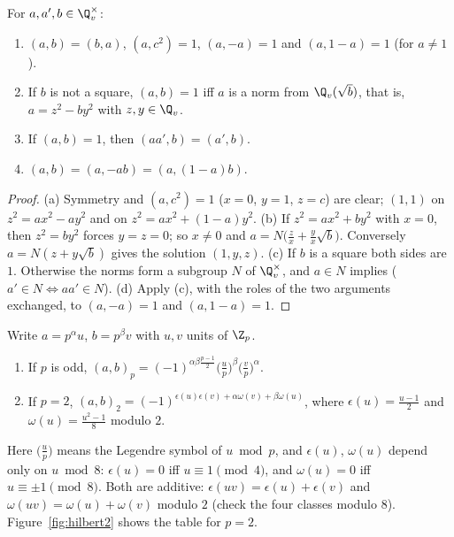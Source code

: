 \begin{proposition}\label{prop:hilbertbasic}
For $a,a',b\in\Q_v^\times$:
\begin{enumerate}[label=(\alph*)]
\item $(a,b)=(b,a)$, $(a,c^2)=1$, $(a,-a)=1$ and $(a,1-a)=1$ (for $a\ne1$).
\item If $b$ is not a square, $(a,b)=1$ iff $a$ is a norm from $\Q_v(\sqrt b)$, that is, $a=z^2-by^2$ with $z,y\in\Q_v$.
\item If $(a,b)=1$, then $(aa',b)=(a',b)$.
\item $(a,b)=(a,-ab)=(a,(1-a)b)$.
\end{enumerate}
\end{proposition}
\begin{proof}
(a) Symmetry and $(a,c^2)=1$ ($x=0$, $y=1$, $z=c$) are clear; $(1,1)$ on $z^2=ax^2-ay^2$ and on $z^2=ax^2+(1-a)y^2$.
(b) If $z^2=ax^2+by^2$ with $x=0$, then $z^2=by^2$ forces $y=z=0$; so $x\ne0$ and $a=N\bigl(\frac zx+\frac yx\sqrt b\bigr)$.
Conversely $a=N(z+y\sqrt b)$ gives the solution $(1,y,z)$. (c) If $b$ is a square both sides are $1$. Otherwise the norms
form a subgroup $N$ of $\Q_v^\times$, and $a\in N$ implies ($a'\in N\iff aa'\in N$). (d) Apply (c), with the roles of the two
arguments exchanged, to $(a,-a)=1$ and $(a,1-a)=1$.
\end{proof}

\begin{theorem}\label{thm:hilbertformula}
Write $a=p^\alpha u$, $b=p^\beta v$ with $u,v$ units of $\Z_p$.
\begin{enumerate}[label=(\alph*)]
\item If $p$ is odd, $(a,b)_p=(-1)^{\alpha\beta\frac{p-1}2}\bigl(\frac up\bigr)^\beta\bigl(\frac vp\bigr)^\alpha$.
\item If $p=2$, $(a,b)_2=(-1)^{\epsilon(u)\epsilon(v)+\alpha\omega(v)+\beta\omega(u)}$, where $\epsilon(u)=\frac{u-1}2$ and
$\omega(u)=\frac{u^2-1}8$ modulo $2$.
\end{enumerate}
\end{theorem}

Here $\bigl(\frac up\bigr)$ means the Legendre symbol of $u\bmod p$, and $\epsilon(u)$, $\omega(u)$ depend only on $u\bmod 8$:
$\epsilon(u)=0$ iff $u\equiv1\pmod4$, and $\omega(u)=0$ iff $u\equiv\pm1\pmod8$. Both are additive: $\epsilon(uv)=\epsilon(u)+
\epsilon(v)$ and $\omega(uv)=\omega(u)+\omega(v)$ modulo $2$ (check the four classes modulo $8$). Figure~\ref{fig:hilbert2} shows
the table for $p=2$.

